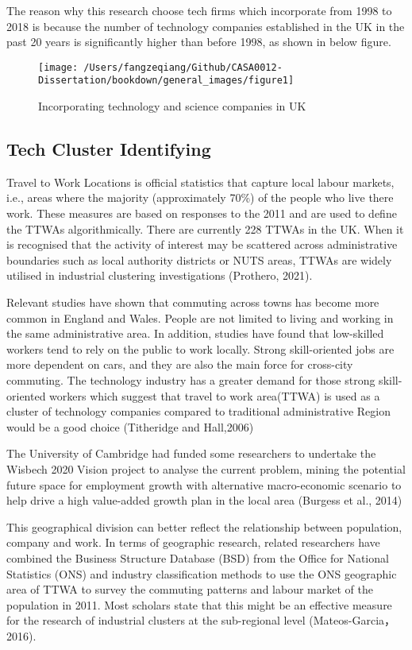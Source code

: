 \documentclass[
  12pt,
  oneside]{book}
\begin{document}
The reason why this research choose tech firms which incorporate from 1998 to 2018 is because the number of technology companies established in the UK in the past 20 years is significantly higher than before 1998, as shown in below figure.

\begin{figure}
\texttt{[image: /Users/fangzeqiang/Github/CASA0012-Dissertation/bookdown/general\_images/figure1]} \caption{Incorporating technology and science companies in UK}\label{fig:fig-1}
\end{figure}

\hypertarget{tech-cluster-identifying}{%
\subsection{Tech Cluster Identifying}\label{tech-cluster-identifying}}

Travel to Work Locations is official statistics that capture local labour markets, i.e., areas where the majority (approximately 70\%) of the people who live there work. These measures are based on responses to the 2011 and are used to define the TTWAs algorithmically. There are currently 228 TTWAs in the UK. When it is recognised that the activity of interest may be scattered across administrative boundaries such as local authority districts or NUTS areas, TTWAs are widely utilised in industrial clustering investigations (Prothero, 2021).

Relevant studies have shown that commuting across towns has become more common in England and Wales. People are not limited to living and working in the same administrative area. In addition, studies have found that low-skilled workers tend to rely on the public to work locally. Strong skill-oriented jobs are more dependent on cars, and they are also the main force for cross-city commuting. The technology industry has a greater demand for those strong skill-oriented workers which suggest that travel to work area(TTWA) is used as a cluster of technology companies compared to traditional administrative Region would be a good choice (Titheridge and Hall,2006)

The University of Cambridge had funded some researchers to undertake the Wisbech 2020 Vision project to analyse the current problem, mining the potential future space for employment growth with alternative macro-economic scenario to help drive a high value-added growth plan in the local area (Burgess et al., 2014)

This geographical division can better reflect the relationship between population, company and work. In terms of geographic research, related researchers have combined the Business Structure Database (BSD) from the Office for National Statistics (ONS) and industry classification methods to use the ONS geographic area of TTWA to survey the commuting patterns and labour market of the population in 2011. Most scholars state that this might be an effective measure for the research of industrial clusters at the sub-regional level (Mateos-Garcia，2016).
\end{document}
